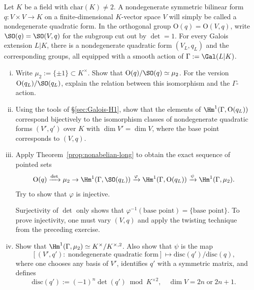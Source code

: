 	\item Let $K$ be a field with $\mathrm{char}(K)\neq2$. A nondegenerate
	symmetric bilinear form $q:V\times V\to K$ on a finite-dimensional
	$K$-vector space $V$ will simply be called a nondegenerate quadratic form.
	In the orthogonal group $\mathrm{O}(q)=\mathrm{O}(V,q)$, write
	$\SO(q)=\SO(V,q)$ for the subgroup cut out by $\det=1$. For every Galois
	extension $L|K$, there is a nondegenerate quadratic form $(V_L,q_L)$ and
	the corresponding groups, all equipped with a smooth action of
	$\Gamma:=\Gal(L|K)$.
	\begin{enumerate}[(i)]
		\item Write $\mu_2:=\{\pm1\}\subset K^\times$. Show that
		$\mathrm{O}(q)/\SO(q)\simeq\mu_2$. For the version
		$\mathrm{O}(q_L)/\SO(q_L)$, explain the relation between this
		isomorphism and the $\Gamma$-action.

		\item Using the tools of \S\ref{sec:Galois-H1}, show that the elements
		of $\Hm^1(\Gamma,\mathrm{O}(q_L))$ correspond bijectively to the
		isomorphism classes of nondegenerate quadratic forms $(V',q')$ over $K$
		with $\dim V'=\dim V$, where the base point corresponds to $(V,q)$.

		\item Apply Theorem~\ref{prop:nonabelian-long} to obtain the exact
		sequence of pointed sets
		\[ \mathrm{O}(q) \xrightarrow{\det} \mu_2 \to \Hm^1(\Gamma, \SO(q_L)) \xrightarrow{\varphi} \Hm^1(\Gamma, \mathrm{O}(q_L)) \xrightarrow{\psi} \Hm^1(\Gamma, \mu_2). \]
		Try to show that $\varphi$ is injective.
		\begin{hint}
			Surjectivity of $\det$ only shows that
			$\varphi^{-1}(\text{base point})=\{\text{base point}\}$. To prove
			injectivity, one must vary $(V,q)$ and apply the twisting technique
			from the preceding exercise.
		\end{hint}

		\item Show that
		$\Hm^1(\Gamma,\mu_2)\simeq K^\times/K^{\times,2}$. Also show that
		$\psi$ is the map
		\[ \left[ (V', q'):\; \text{nondegenerate quadratic form} \right] \mapsto \mathrm{disc}(q') / \mathrm{disc}(q), \]
		where one chooses any basis of $V'$, identifies $q'$ with a symmetric
		matrix, and defines
		\[ \mathrm{disc}(q') := (-1)^n \det(q') \bmod K^{\times 2}, \quad \dim V = 2n \;\text{or}\; 2n+1. \]


\end{enumerate}
